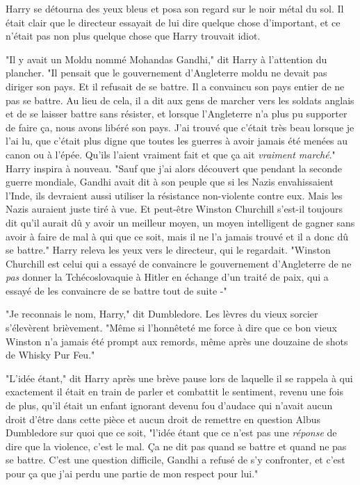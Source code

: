 Harry se détourna des yeux bleus et posa son regard sur le noir métal du sol. Il était clair que le directeur essayait de lui dire quelque chose d'important, et ce n'était pas non plus quelque chose que Harry trouvait idiot.

"Il y avait un Moldu nommé Mohandas Gandhi," dit Harry à l'attention du plancher. "Il pensait que le gouvernement d'Angleterre moldu ne devait pas diriger son pays. Et il refusait de se battre. Il a convaincu son pays entier de ne pas se battre. Au lieu de cela, il a dit aux gens de marcher vers les soldats anglais et de se laisser battre sans résister, et lorsque l'Angleterre n'a plus pu supporter de faire ça, nous avons libéré son pays. J'ai trouvé que c'était très beau lorsque je l'ai lu, que c'était plus digne que toutes les guerres à avoir jamais été menées au canon ou à l'épée. Qu'ils l'aient vraiment fait et que ça ait \emph{vraiment marché}." Harry inspira à nouveau. "Sauf que j'ai alors découvert que pendant la seconde guerre mondiale, Gandhi avait dit à son peuple que si les Nazis envahissaient l'Inde, ils devraient aussi utiliser la résistance non-violente contre eux. Mais les Nazis auraient juste tiré à vue. Et peut-être Winston Churchill s'est-il toujours dit qu'il aurait dû y avoir un meilleur moyen, un moyen intelligent de gagner sans avoir à faire de mal à qui que ce soit, mais il ne l'a jamais trouvé et il a donc dû se battre." Harry releva les yeux vers le directeur, qui le regardait. "Winston Churchill est celui qui a essayé de convaincre le gouvernement d'Angleterre de ne \emph{pas} donner la Tchécoslovaquie à Hitler en échange d'un traité de paix, qui a essayé de les convaincre de se battre tout de suite -"

"Je reconnais le nom, Harry," dit Dumbledore. Les lèvres du vieux sorcier s'élevèrent brièvement. "Même si l'honnêteté me force à dire que ce bon vieux Winston n'a jamais été prompt aux remords, même après une douzaine de shots de Whisky Pur Feu."

"L'idée étant," dit Harry après une brève pause lors de laquelle il se rappela à qui exactement il était en train de parler et combattit le sentiment, revenu une fois de plus, qu'il était un enfant ignorant devenu fou d'audace qui n'avait aucun droit d'être dans cette pièce et aucun droit de remettre en question Albus Dumbledore sur quoi que ce soit, "l'idée étant que ce n'est pas une \emph{réponse} de dire que la violence, c'est le mal. Ça ne dit pas quand se battre et quand ne pas se battre. C'est une question difficile, Gandhi a refusé de s'y confronter, et c'est pour ça que j'ai perdu une partie de mon respect pour lui."

